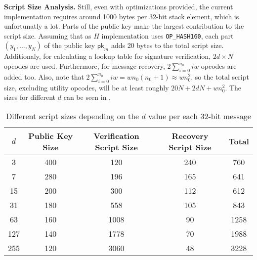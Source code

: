 \documentclass{iacrtrans}
\begin{document}
\textbf{Script Size Analysis.} Still, even with optimizations provided, the
current implementation requires around 1000 bytes per 32-bit stack
element, which is unfortunatly a lot. Parts of the public key make the
largest contribution to the script size. Assuming that as $H$
implementation uses \texttt{OP\_HASH160}, each part $(y_1,\dots,y_N)$
of the public key $\mathsf{pk}_{m}$ adds 20 bytes to the total script
size. Additionaly, for calculating a lookup table for signature
verification, $2d \times N$ opcodes are used. Furthermore, for message
recovery, $2\sum_{i = 0}^{n_0} i w$ opcodes are added
too. Also, note that $2 \sum_{i = 0}^{n_0} i w = w n_0 (n_0+1) \approx w n_0^2$, 
so the total script size, excluding utility opcodes, will be at least roughly
$20N + 2 dN + w n_0^2$. The sizes for different $d$ can be seen
in .

\iffalse{}
\begin{verbatim}
import math
l = 32
ds = [3, 7, 15, 31, 63, 127, 255]

for d in ds:
    w = math.ceil(math.log(d+1, 2))
    n0 = math.ceil(l / w)
    n1 = math.ceil((2**w * n0).bit_length() / w)
    k = n0 + n1
    
    pk_size = 20 * k
    ver_size = 2 * d * k
    rec_size = 0
    for i in range(0, n0):
        rec_size += int(i * w)
    
    total = pk_size + ver_size + rec_size
    
    print(f"{d} & {pk_size} & {ver_size} & {rec_size} & {total} \\\\")
\end{verbatim}
\fi
\begin{table}[H]
  \centering
  \begin{tabular}{ccccc}
    \toprule
    $d$ & \textbf{Public Key Size} & \textbf{Verification Script Size} & \textbf{Recovery Script Size} & \textbf{Total} \\
    \midrule
    3 & 400 & 120 & 240 & 760 \\
    7 & 280 & 196 & 165 & 641 \\
    15 & 200 & 300 & 112 & 612 \\
    31 & 180 & 558 & 105 & 843 \\
    63 & 160 & 1008 & 90 & 1258 \\
    127 & 140 & 1778 & 70 & 1988 \\
    255 & 120 & 3060 & 48 & 3228 \\
    \bottomrule
  \end{tabular}
  \caption{Different script sizes depending on the $d$
  value per each 32-bit message}\label{tab:winternitz-script-size}
\end{table}
\end{document}
